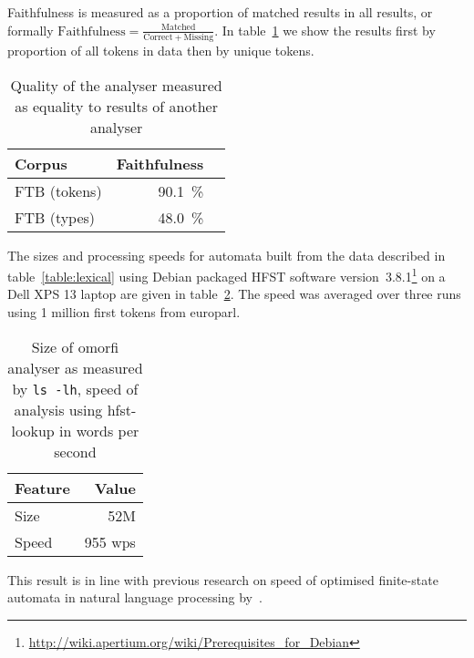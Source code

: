 \documentclass[a4paper,12pt]{article}
\begin{document}
Faithfulness is measured as a proportion of matched results in all results, or
formally $\mathrm{Faithfulness} = \frac{\mathrm{Matched}}{\mathrm{Correct} +
\mathrm{Missing}}$. In table~\ref{table:quality} we show the results first
by proportion of all tokens in data then by unique tokens.

\begin{table}
    \begin{scriptsize}
    \centering
    \begin{tabular}{|l|r|r|}
        \hline
        \bf Corpus & \bf Faithfulness \\
        \hline
        FTB (tokens) & 90.1~\% \\
        FTB (types)  & 48.0~\% \\
        \hline
    \end{tabular}
    \caption{Quality of the analyser measured as equality to results of
        another analyser \label{table:quality}}
  \end{scriptsize}
\end{table}

The sizes and processing speeds for automata built from the data described in
table~\ref{table:lexical} using Debian packaged HFST software
version~3.8.1\footnote{\url{http://wiki.apertium.org/wiki/Prerequisites_for_Debian}}
on a Dell XPS 13 laptop are given in table~\ref{table:size-speed}. The speed
was averaged over three runs using 1 million first tokens from europarl.

\begin{table}
    \begin{scriptsize}
        \centering
        \begin{tabular}{|l|r|}
            \hline
            \bf Feature & \bf Value \\
            \hline
            Size & 52M \\
            Speed & 955 wps\\
            \hline
        \end{tabular}
        \caption{Size of omorfi analyser as measured by \texttt{ls -lh}, speed
        of analysis using hfst-lookup in words per second \label{table:size-speed}}
    \end{scriptsize}
\end{table}

This result is in line with previous research on speed of optimised finite-state
automata in natural language processing by~\citet{silfverberg2009hfst}.
\end{document}
